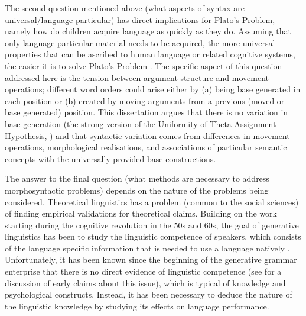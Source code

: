 The second question mentioned above (what aspects of syntax are universal/language particular) has direct implications for Plato's Problem, namely how do children acquire language as quickly as they do. Assuming that only language particular material needs to be acquired, the more universal properties that can be ascribed to human language or related cognitive systems, the easier it is to solve Plato's Problem \citep{Chomsky.1993}. The specific aspect of this question addressed here is the tension between argument structure and movement operations; different word orders could arise either by (a) being base generated in each position or (b) created by moving arguments from a previous (moved or base generated) position. This dissertation argues that there is no variation in base generation (the strong version of the Uniformity of Theta Assignment Hypothesis, \citealt{Baker.1988}) and that syntactic variation comes from differences in movement operations, morphological realisations, and associations of particular semantic concepts with the universally provided base constructions.

The answer to the final question (what methods are necessary to address morphosyntactic problems) depends on the nature of the problems being considered. Theoretical linguistics has a problem (common to the social sciences) of finding empirical validations for theoretical claims. Building on the work starting during the cognitive revolution in the 50s and 60s, the goal of generative linguistics has been to study the linguistic competence of speakers, which consists of the language specific information that is needed to use a language natively \citep{Chomsky.1981,Chomsky.1986}. Unfortunately, it has been known since the beginning of the generative grammar enterprise that there is no direct evidence of linguistic competence (see \cite{Schutze.1996} for a discussion of early claims about this issue), which is typical of knowledge and psychological constructs. Instead, it has been necessary to deduce the nature of the linguistic knowledge by studying its effects on language performance.

